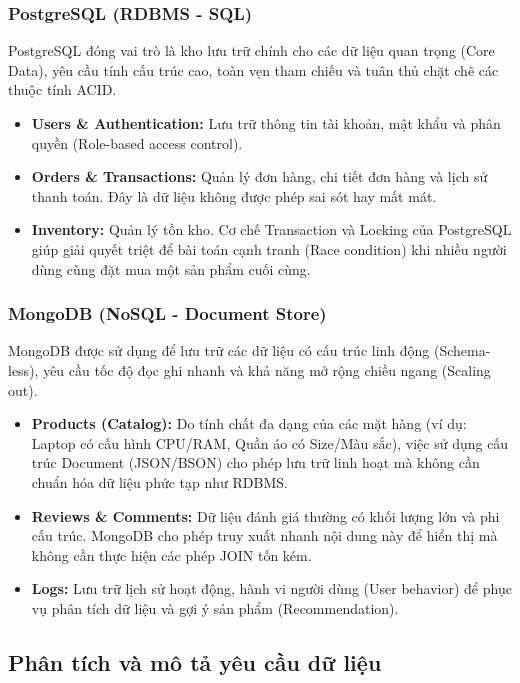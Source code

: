 \subsubsection{PostgreSQL (RDBMS - SQL)}
PostgreSQL đóng vai trò là kho lưu trữ chính cho các dữ liệu quan trọng (Core Data), yêu cầu tính cấu trúc cao, toàn vẹn tham chiếu và tuân thủ chặt chẽ các thuộc tính ACID.
\begin{itemize}[label=$\circ$]
    \item \textbf{Users \& Authentication:} Lưu trữ thông tin tài khoản, mật khẩu và phân quyền (Role-based access control).
    \item \textbf{Orders \& Transactions:} Quản lý đơn hàng, chi tiết đơn hàng và lịch sử thanh toán. Đây là dữ liệu không được phép sai sót hay mất mát.
    \item \textbf{Inventory:} Quản lý tồn kho. Cơ chế Transaction và Locking của PostgreSQL giúp giải quyết triệt để bài toán cạnh tranh (Race condition) khi nhiều người dùng cùng đặt mua một sản phẩm cuối cùng.
\end{itemize}

\subsubsection{MongoDB (NoSQL - Document Store)}
MongoDB được sử dụng để lưu trữ các dữ liệu có cấu trúc linh động (Schema-less), yêu cầu tốc độ đọc ghi nhanh và khả năng mở rộng chiều ngang (Scaling out).
\begin{itemize}[label=$\circ$]
    \item \textbf{Products (Catalog):} Do tính chất đa dạng của các mặt hàng (ví dụ: Laptop có cấu hình CPU/RAM, Quần áo có Size/Màu sắc), việc sử dụng cấu trúc Document (JSON/BSON) cho phép lưu trữ linh hoạt mà không cần chuẩn hóa dữ liệu phức tạp như RDBMS.
    \item \textbf{Reviews \& Comments:} Dữ liệu đánh giá thường có khối lượng lớn và phi cấu trúc. MongoDB cho phép truy xuất nhanh nội dung này để hiển thị mà không cần thực hiện các phép JOIN tốn kém.
    \item \textbf{Logs:} Lưu trữ lịch sử hoạt động, hành vi người dùng (User behavior) để phục vụ phân tích dữ liệu và gợi ý sản phẩm (Recommendation).
\end{itemize}

\subsection{Phân tích và mô tả yêu cầu dữ liệu}
